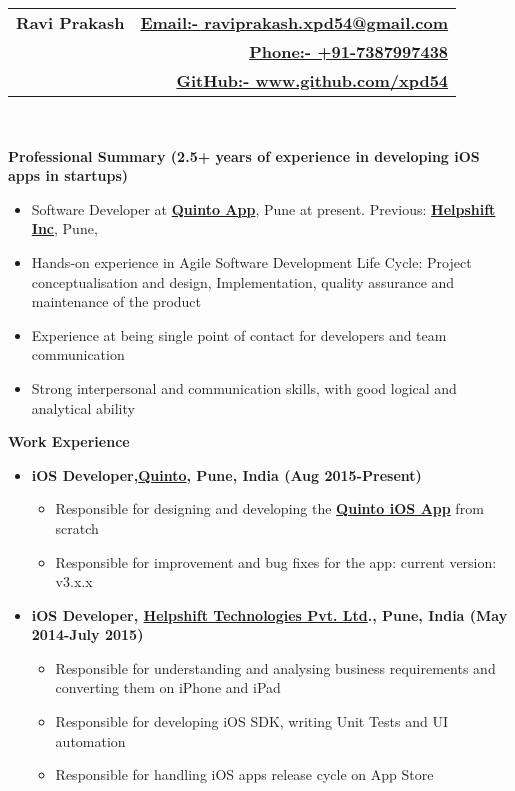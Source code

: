 \documentclass[letterpaper,11pt]{article}
\newcommand{\resitem}[1]{\item #1 \vspace{-2pt}}
\newcommand{\resheading}[1]{{\large \colorbox{mygrey}{\begin{minipage}{\textwidth}{\textbf{#1 \vphantom{p\^{E}}}}\end{minipage}}}}
\begin{document}
\newcommand{\mywebheader}{
\begin{tabular*}{7in}{l@{\extracolsep{\fill}}r}
	\textbf{\Huge \bfseries Ravi Prakash} 
	& \href{mailto:raviprakash.xpd54@gmail.com}{\normalsize \bfseries Email:- \mdseries raviprakash.xpd54@gmail.com}\\
	 & \href{tel:+917387997438}{\normalsize \bfseries Phone:- \mdseries +91-7387997438}\\
	 & \href{http://www.github.com/xpd54}{\normalsize \bfseries GitHub:- \mdseries www.github.com/xpd54}\\
	\end{tabular*}
\\}
\mywebheader

\resheading{\Large Professional Summary \normalsize \bfseries (2.5+ years of experience in developing iOS apps in startups)}
{ \footnotesize
\begin{itemize}
	\resitem{Software Developer at \href{http://quintoapp.com}{\bfseries Quinto App}, Pune at present. Previous: \href{helpshift.com} {\bfseries  Helpshift Inc}, Pune,}
	\resitem{Hands-on experience in Agile Software Development Life Cycle: Project conceptualisation and design, Implementation,
quality assurance and maintenance of the product}
	\resitem{Experience at being single point of contact for developers and team communication}
	\resitem{Strong interpersonal and communication skills, with good logical and analytical ability}
\end{itemize}
} %

\resheading{Work Experience}
	\begin{itemize}
	\resitem {{\bfseries iOS Developer,\href{http://quintoapp.com} {Quinto}, Pune, India (Aug 2015-Present)}}
				{ \footnotesize
				\begin{itemize}
					\resitem{Responsible for designing and developing the \href{https://itunes.apple.com/in/app/id912305961}{\bfseries Quinto iOS App} from scratch}
					\resitem{Responsible for improvement and bug fixes for the app: current version: v3.x.x}
				\end{itemize}
				}
	\resitem {{\bfseries iOS Developer, \href{https://helpshift.com}{\bfseries Helpshift Technologies Pvt. Ltd}., Pune, India (May 2014-July 2015)}}
				{ \footnotesize
				\begin{itemize}
					\resitem{Responsible for understanding and analysing business requirements and converting them on iPhone and iPad}
					\resitem{Responsible for developing iOS SDK, writing Unit Tests and UI automation}
					\resitem{Responsible for handling iOS apps release cycle on App Store}
				\end{itemize}
				}
\end{itemize}  %
\end{document}

